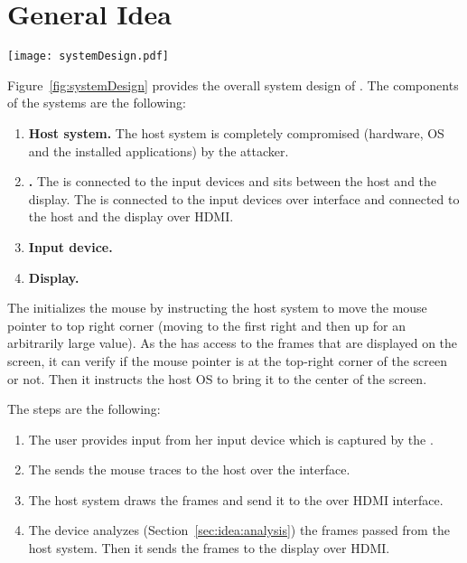 \section{General Idea}
\label{sec:idea}


\begin{figure*}
\centering
\texttt{[image: systemDesign.pdf]}
\caption{System Design}
\label{fig:systemDesign}
\centering
\end{figure*}


Figure~\ref{fig:systemDesign} provides the overall system design of \name. The components of the systems are the following:

\begin{enumerate}
  \item \textbf{Host system.} The host system is completely compromised (hardware, OS and the installed applications) by the attacker.
  \item \textbf{\device.} The \device is connected to the input devices and sits between the host and the display. The \device is connected to the input devices over \usb interface and connected to the host and the display over HDMI.
  \item \textbf{Input device.}
  \item \textbf{Display.}
  
\end{enumerate}

 The \device initializes the mouse by instructing the host system to move the mouse pointer to top right corner (moving to the first right and then up for an arbitrarily large value). As the \device has access to the frames that are displayed on the screen, it can verify if the mouse pointer is at the top-right corner of the screen or not. Then it instructs the host OS to bring it to the center of the screen.

The steps are the following:

\begin{enumerate}
  \item The user provides input from her input device which is captured by the \device.
  \item The \device sends the mouse traces to the host over the \bluetooth interface.
  \item The host system draws the frames and send it to the \device over HDMI interface.
  \item The device analyzes (Section~\ref{sec:idea:analysis}) the frames passed from the host system. Then it sends the frames to the display over HDMI.
\end{enumerate}





